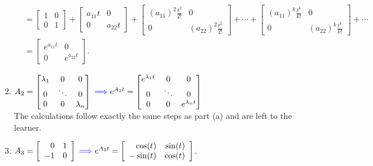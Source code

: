 \begin{enumerate}
\begin{align*}
 & = \left[\begin{array}{cc} 1 & 0 \\ 0 & 1 \end{array} \right] + \left[\begin{array}{cc} a_{11} t & 0 \\ 0 & a_{22}t \end{array} \right]   +  \left[ \begin{array}{cc} \left(a_{11}\right)^2 \frac{t^2}{2!}& 0\\0 & \left(a_{22}\right)^2 \frac{t^2}{2!}\end{array}\right]  + \cdots + \left[ \begin{array}{cc} \left(a_{11}\right)^k \frac{t^k}{k!}& 0\\0 & \left(a_{22}\right)^k \frac{t^k}{k!}\end{array}\right]   + \cdots \\[1em]
 & = \left[ \begin{array}{cc} e^{a_{11}t} & 0\\0 & e^{a_{22}t} \end{array}\right].     
 \end{align*}
         
    
     \item $A_2=\begin{bmatrix}\lambda_{1} & 0 & 0\\
0 & \ddots & 0\\
0 & 0 & \lambda_{n}
\end{bmatrix} {\color{blue}\implies} e^{A_2 t} = \begin{bmatrix}e^{\lambda_{1} t} & 0 & 0\\
0 & \ddots & 0\\
0 & 0 & e^{\lambda_{n} t}
\end{bmatrix} $ \\

The calculations follow exactly the same steps as part (a) and are left to the learner.

     \item $A_3 = \left[ \begin{array}{rr} 0 & 1\\-1 & 0\end{array}\right] {\color{blue}\implies} e^{A_3t} =  \left[ \begin{array}{rr}\cos(t) & \sin(t) \\ - \sin(t) & \cos(t) \end{array}\right]$. \\
     

\end{enumerate}

